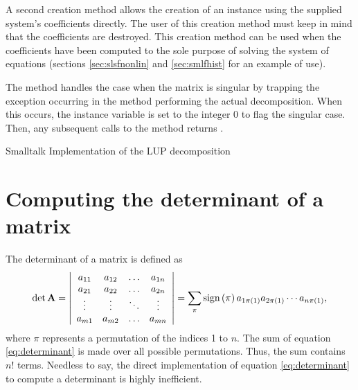 A second creation method  allows the creation of an
instance using the supplied system's coefficients directly. The
user of this creation method must keep in mind that the
coefficients are destroyed. This creation method can be used when
the coefficients have been computed to the sole purpose of solving
the system of equations (\cf sections \ref{sec:slsfnonlin} and
\ref{sec:smlfhist} for an example of use).

The method  handles the case when the
matrix is singular by trapping the exception occurring in the
method  performing the actual decomposition. When
this occurs, the instance variable  is set to the
integer 0 to flag the singular case. Then, any subsequent calls to
the method  returns .

\begin{listing}[label=lst:lup]{Smalltalk}
{Implementation of the LUP decomposition}
%
\end{listing}

\section{Computing the determinant of a matrix}
\label{sec:determinant} The determinant of a matrix is defined
as
\begin{equation}
\label{eq:determinant}
  \det\textbf{A}=\left|
  \begin{array}{cccc}a_{11}& a_{12}&\ldots& a_{1n}\\
  a_{21}& a_{22}&\ldots& a_{2n}\\
  \vdots&\vdots&\ddots&\vdots\\
  a_{m1}& a_{m2}&\ldots& a_{mn}\\ \end{array}
  \right|=\sum_{\pi}\mathop{\textrm{sign}}\left({\pi}\right) a_{1\pi\left(1\right)}a_{2\pi\left(1\right)}
  \cdots a_{n\pi\left(1\right)},
\end{equation}
where $\pi$ represents a permutation of the indices 1 to $n$. The
sum of equation \ref{eq:determinant} is made over all possible
permutations. Thus, the sum contains $n!$ terms. Needless to say,
the direct implementation of equation \ref{eq:determinant} to
compute a determinant is highly inefficient.

